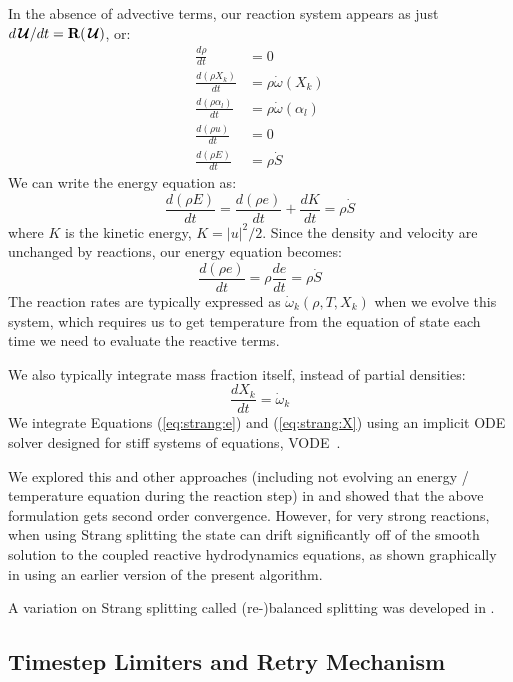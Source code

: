 \documentclass[times,modern]{aastex63}
\newcommand{\omegadot}{\dot{\omega}}
\newcommand{\Sdot}{\dot{S}}
\newcommand{\odt}[1]{{\frac{{d#1}}{dt}}}
\newcommand{\Uc}{{\,\bm{\mathcal{U}}}}
\newcommand{\Rb}{{\bf R}}
\begin{document}
In the absence of advective terms, our reaction system appears as just
$d\Uc/dt = \Rb(\Uc)$, or:
\begin{align}
\odt{\rho} & = 0 \\
\odt{(\rho X_k)} &= \rho \omegadot(X_k) \\
\odt{(\rho \alpha_l)} &= \rho \omegadot(\alpha_l) \\
\odt{(\rho u)} &= 0 \\
\odt{(\rho E)} &= \rho \Sdot
\end{align}
We can write the energy equation as:
\begin{equation}
\odt{(\rho E)} = \odt{(\rho e)} + \odt{K} = \rho \Sdot
\end{equation}
where $K$ is the kinetic energy, $K = |u|^2/2$.  Since the density and velocity
are unchanged by reactions, our energy equation becomes:
\begin{equation}
\label{eq:strang:e}
\odt{(\rho e)} = \rho \odt{e} = \rho \Sdot
\end{equation}
The reaction rates are typically expressed as $\omegadot_k(\rho, T, X_k)$
when we evolve this system, which requires us to get temperature from
the equation of state each
time we need to evaluate the reactive terms.  

We also typically integrate mass fraction itself, instead of partial
densities:
\begin{equation}
\label{eq:strang:X}
\odt{X_k} = \omegadot_k
\end{equation}
We integrate Equations (\ref{eq:strang:e}) and (\ref{eq:strang:X}) using
an implicit ODE solver designed for stiff systems of
equations, VODE~\citep{vode}.

We explored this and other approaches (including not evolving an
energy / temperature equation during the reaction step) in
\citet{strang_rnaas} and showed that the above formulation gets second
order convergence.  However, for very strong reactions, when using
Strang splitting the state can drift significantly off of the smooth
solution to the coupled reactive hydrodynamics equations, as shown
graphically in \cite{astronum:2018} using an earlier version of the
present algorithm.

A variation on Strang splitting called (re-)balanced splitting was
developed in \citet{speth:2013}.


\subsection{Timestep Limiters and Retry Mechanism}
\end{document}

